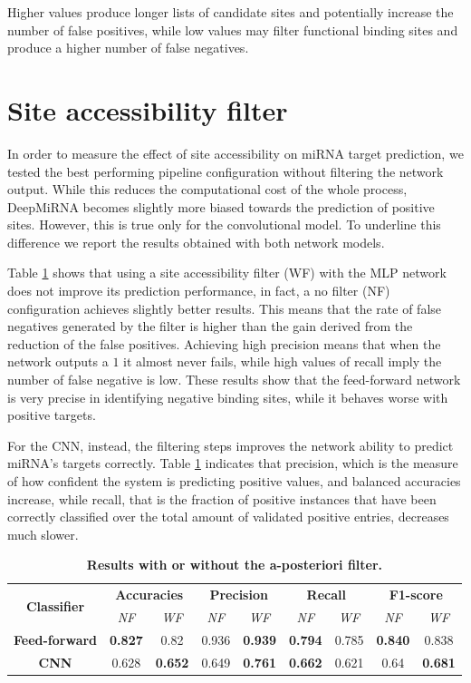 Higher values produce longer lists of candidate sites and potentially increase the number of false positives, while low values may filter functional binding sites and produce a higher number of false negatives.  



\section{Site accessibility filter}
In order to measure the effect of site accessibility on miRNA target prediction, we tested the best performing pipeline configuration without filtering the network output. While this reduces the computational cost of the whole process, DeepMiRNA becomes slightly more biased towards the prediction of positive sites. However, this is true only for the convolutional model. To underline this difference we report the results obtained with both network models.

Table \ref{tab:sa_filter} shows that using a site accessibility filter (WF) with the MLP network does not improve its prediction performance, in fact, a no filter (NF) configuration achieves slightly better results. This means that the rate of false negatives generated by the filter is higher than the gain derived from the reduction of the false positives. Achieving high precision means that when the network outputs a $1$ it almost never fails, while high values of recall imply the number of false negative is low. These results show that the feed-forward network is very precise in identifying negative binding sites, while it behaves worse with positive targets.  

For the CNN, instead, the filtering steps improves the network ability to predict miRNA's targets correctly. Table \ref{tab:sa_filter} indicates that precision, which is the measure of how confident the system is predicting positive values, and balanced accuracies increase, while recall, that is the fraction of positive instances that have been correctly classified over the total amount of validated positive entries, decreases much slower. 

\begin{table}[h!]
	\caption{\textbf{Results with or without the a-posteriori filter.}}
	\label{tab:sa_filter}
	\centering
	\begin{tabular}{| c | c | c | c | c | c | c | c | c |}
		\hline
		\multirow{2}{4.5em}{\textbf{Classifier}} & \multicolumn{2}{c|}{\textbf{Accuracies}} & \multicolumn{2}{c|}{\textbf{Precision}} & \multicolumn{2}{c|}{\textbf{Recall}} & \multicolumn{2}{c|}{\textbf{F1-score}} \\ 
		\cline{2-9}
		& \emph{NF} & \emph{WF} & \emph{NF} & \emph{WF} & \emph{NF} & \emph{WF} & \emph{NF} & \emph{WF} \\ 
		\hline
		\textbf{Feed-forward} & \textbf{0.827} & 0.82 & 0.936 & \textbf{0.939} & \textbf{0.794} & 0.785 & \textbf{0.840} & 0.838 \\ 
		\hline
		\textbf{CNN} & 0.628 & \textbf{0.652} & 0.649 & \textbf{0.761} & \textbf{0.662} & 0.621 & 0.64 & \textbf{0.681} \\ 
		\hline 
	\end{tabular}
\end{table}

